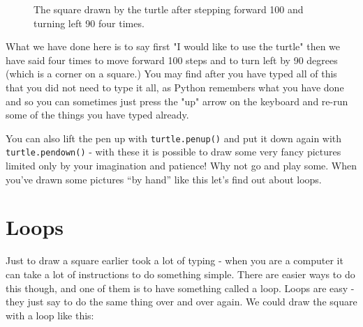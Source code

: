 \documentclass[a4paper, 11pt]{book}
\begin{document}
\begin{figure}
\label{figure-turtle-001-square}
\centering
{}
\caption{The square drawn by the turtle after stepping forward 100 and
  turning left 90 four times.}
\end{figure}

What we have done here is to say first "I would like to use the turtle" then we have said four times to move forward 100 steps and to turn left by 90 degrees (which is a corner on a square.) You may find after you have typed all of this that you did not need to type it all, as Python remembers what you have done and so you can sometimes just press the "up" arrow on the keyboard and re-run some of the things you have typed already.

You can also lift the pen up with \verb|turtle.penup()| and put it down again with \verb|turtle.pendown()| - with these it is possible to draw some very fancy pictures limited only by your imagination and patience! Why not go and play some. When you've drawn some pictures ``by hand'' like this let's find out about loops.

\section{Loops}

Just to draw a square earlier took a lot of typing - when you are a computer it can take a lot of instructions to do something simple. There are easier ways to do this though, and one of them is to have something called a loop. Loops are easy - they just say to do the same thing over and over again. We could draw the square with a loop like this:
\end{document}

